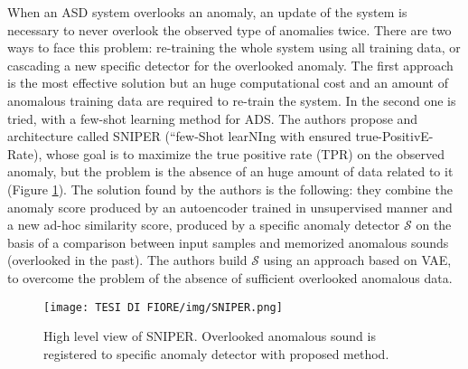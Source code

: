 When an ASD system overlooks an anomaly, an update of the system is necessary to never overlook the observed type of anomalies twice. There are two ways to face this problem: re-training the whole system using all training data, or cascading a new specific detector for the overlooked anomaly. The first approach is the most effective solution but an huge computational cost and an amount of anomalous training data are required to re-train the system. In \cite{25SNIPER} the second one is tried, with a few-shot learning method for ADS. The authors propose and architecture called SNIPER (“few-Shot learNIng with ensured true-PositivE-Rate), whose goal is to maximize the true positive rate (TPR) on the observed anomaly, but the problem is the absence of an huge amount of data related to it (Figure \ref{SNIPER}). The solution found by the authors is the following: they combine the anomaly score produced by an autoencoder trained in unsupervised manner and a new ad-hoc similarity score, produced by a specific anomaly detector $\mathcal{S}$ on the basis of a comparison between input samples and memorized anomalous sounds (overlooked in the past). The authors build $\mathcal{S}$ using an approach based on VAE, to overcome the problem of the absence of sufficient overlooked anomalous data.
\begin{figure}[ht]
\texttt{[image: TESI DI FIORE/img/SNIPER.png]}
\centering
\caption{High level view of SNIPER. Overlooked anomalous sound is registered to specific anomaly detector with proposed method. \cite{25SNIPER}}
\label{SNIPER}
\end{figure}
